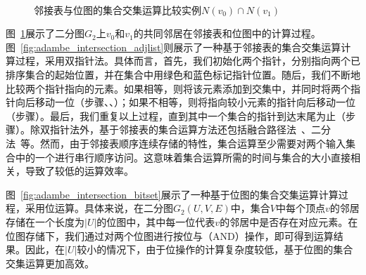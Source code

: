 

\begin{figure} [t]
	\centering
  \\
	\caption{邻接表与位图的集合交集运算比较实例$N(v_0)\cap N(v_1)$}
	
	\label{fig:adambe_intersection}
\end{figure}


\begin{example}
	
	图~\ref{fig:adambe_intersection}展示了二分图$G_2$上$v_0$和$v_1$的共同邻居在邻接表和位图中的计算过程。图~\ref{fig:adambe_intersection_adjlist}则展示了一种基于邻接表的集合交集运算计算过程，采用双指针法。具体而言，首先，我们初始化两个指针，分别指向两个已排序集合的起始位置，并在集合中用绿色和蓝色标记指针位置。随后，我们不断地比较两个指针指向的元素。如果相等，则将该元素添加到交集中，并同时将两个指针向后移动一位（步骤、、）；如果不相等，则将指向较小元素的指针向后移动一位（步骤）。最后，我们重复以上过程，直到其中一个集合的指针到达末尾为止（步骤）。除双指针法外，基于邻接表的集合运算方法还包括融合路径法~\cite{GpuMergePathIntersect14,MergePath18}、二分法~\cite{BinaryIntersect18,triangle18}等。然而，由于邻接表顺序连续存储的特性，集合运算至少需要对两个输入集合中的一个进行串行顺序访问。这意味着集合运算所需的时间与集合的大小直接相关，导致了较低的运算效率。
	
	图~\ref{fig:adambe_intersection_bitset}展示了一种基于位图的集合交集运算计算过程，采用位运算。具体来说，在二分图$G_2(U,V,E)$中，集合$V$中每个顶点$v$的邻居存储在一个长度为$|U|$的位图中，其中每一位代表$v$的邻居中是否存在对应元素。在位图存储下，我们通过对两个位图进行按位与（AND）操作，即可得到运算结果。因此，在$|U|$较小的情况下，由于位操作的计算复杂度较低，基于位图的集合交集运算更加高效。

\end{example}

